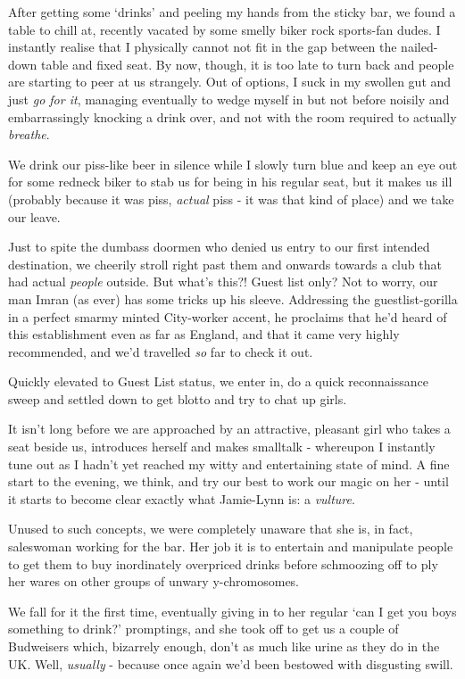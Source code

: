 \documentclass[a5paper,titlepage,11pt]{book}
\begin{document}
After getting some `drinks' and peeling my hands from the sticky bar, we found a table to chill at, recently vacated by some smelly biker rock sports-fan dudes.  I instantly realise that I physically cannot not fit in the gap between the nailed-down table and fixed seat.  By now, though, it is too late to turn back and people are starting to peer at us strangely.  Out of options, I suck in my swollen gut and just \emph{go for it}, managing eventually to wedge myself in but not before noisily and embarrassingly knocking a drink over, and not with the room required to actually \emph{breathe}.

We drink our piss-like beer in silence while I slowly turn blue and keep an eye out for some redneck biker to stab us for being in his regular seat, but it makes us ill (probably because it was piss, \emph{actual} piss - it was that kind of place) and we take our leave.

Just to spite the dumbass doormen who denied us entry to our first intended destination, we cheerily stroll right past them and onwards towards a club that had actual \emph{people} outside.  But what's this?!  Guest list only?  Not to worry, our man Imran (as ever) has some tricks up his sleeve.  Addressing the guestlist-gorilla in a perfect smarmy minted City-worker accent, he proclaims that he'd heard of this establishment even as far as England, and that it came very highly recommended, and we'd travelled \emph{so} far to check it out.

Quickly elevated to Guest List status, we enter in, do a quick reconnaissance sweep and settled down to get blotto and try to chat up girls.

It isn't long before we are approached by an attractive, pleasant girl who takes a seat beside us, introduces herself and makes smalltalk - whereupon I instantly tune out as I hadn't yet reached my witty and entertaining state of mind.  A fine start to the evening, we think, and try our best to work our magic on her - until it starts to become clear exactly what Jamie-Lynn is: a \emph{vulture}.

Unused to such concepts, we were completely unaware that she is, in fact, saleswoman working for the bar.  Her job it is to entertain and manipulate people to get them to buy inordinately overpriced drinks before schmoozing off to ply her wares on other groups of unwary y-chromosomes.

We fall for it the first time, eventually giving in to her regular `can I get you boys something to drink?' promptings, and she took off to get us a couple of Budweisers which, bizarrely enough, don't as much like urine as they do in the UK.  Well, \emph{usually} - because once again we'd been bestowed with disgusting swill.
\end{document}
